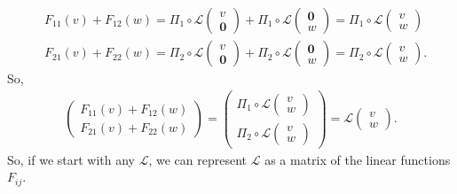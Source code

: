 \documentclass{book}
\theoremstyle{definition}
\newcommand{\F}{\mathcal{F}}
\newcommand{\lag}{\mathcal{L}}
\begin{document}
\begin{align}
&F_{11}(v) + F_{12}(w) = \Pi_1 \circ \lag\begin{pmatrix}
v \\ \mathbf{0}
\end{pmatrix}
+
\Pi_1 \circ \lag \begin{pmatrix}
\mathbf{0} \\ w
\end{pmatrix}
=
\Pi_1 \circ \lag\begin{pmatrix}
v\\w
\end{pmatrix}\\
&F_{21}(v) + F_{22}(w) = \Pi_2 \circ \lag\begin{pmatrix}
v \\ \mathbf{0}
\end{pmatrix}
+
\Pi_2 \circ \lag \begin{pmatrix}
\mathbf{0} \\ w
\end{pmatrix}
=
\Pi_2 \circ \lag\begin{pmatrix}
v\\w
\end{pmatrix}.
\end{align}
So,
\begin{align*}
\begin{pmatrix}
F_{11}(v) + F_{12}(w)\\F_{21}(v) + F_{22}(w)
\end{pmatrix}
= \begin{pmatrix}
\Pi_1 \circ \lag\begin{pmatrix}
v\\w
\end{pmatrix}\\
\Pi_2 \circ \lag\begin{pmatrix}
v\\w
\end{pmatrix}
\end{pmatrix}
=
\lag\begin{pmatrix}
v\\w
\end{pmatrix}.
\end{align*}
So, if we start with any $\lag$, we can represent $\lag$ as a matrix of the linear functions $F_{ij}$.
\end{document}
